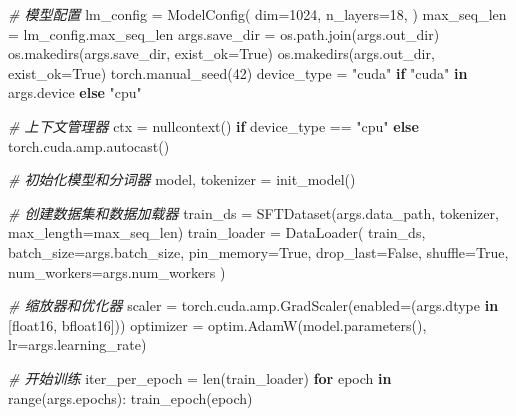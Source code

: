 \documentclass[
]{article}
\newenvironment{Shaded}{}{}
\newcommand{\BuiltInTok}[1]{\textcolor[rgb]{0.00,0.50,0.00}{#1}}
\newcommand{\CommentTok}[1]{\textcolor[rgb]{0.38,0.63,0.69}{\textit{#1}}}
\newcommand{\ControlFlowTok}[1]{\textcolor[rgb]{0.00,0.44,0.13}{\textbf{#1}}}
\newcommand{\DecValTok}[1]{\textcolor[rgb]{0.25,0.63,0.44}{#1}}
\newcommand{\KeywordTok}[1]{\textcolor[rgb]{0.00,0.44,0.13}{\textbf{#1}}}
\newcommand{\NormalTok}[1]{#1}
\newcommand{\OperatorTok}[1]{\textcolor[rgb]{0.40,0.40,0.40}{#1}}
\newcommand{\StringTok}[1]{\textcolor[rgb]{0.25,0.44,0.63}{#1}}
\newcommand{\VariableTok}[1]{\textcolor[rgb]{0.10,0.09,0.49}{#1}}
\begin{document}
\begin{Shaded}
\begin{Highlighting}[]
    \CommentTok{\# 模型配置}
\NormalTok{    lm\_config }\OperatorTok{=}\NormalTok{ ModelConfig(}
\NormalTok{        dim}\OperatorTok{=}\DecValTok{1024}\NormalTok{,}
\NormalTok{        n\_layers}\OperatorTok{=}\DecValTok{18}\NormalTok{,}
\NormalTok{    )}
\NormalTok{    max\_seq\_len }\OperatorTok{=}\NormalTok{ lm\_config.max\_seq\_len}
\NormalTok{    args.save\_dir }\OperatorTok{=}\NormalTok{ os.path.join(args.out\_dir)}
\NormalTok{    os.makedirs(args.save\_dir, exist\_ok}\OperatorTok{=}\VariableTok{True}\NormalTok{)}
\NormalTok{    os.makedirs(args.out\_dir, exist\_ok}\OperatorTok{=}\VariableTok{True}\NormalTok{)}
\NormalTok{    torch.manual\_seed(}\DecValTok{42}\NormalTok{)}
\NormalTok{    device\_type }\OperatorTok{=} \StringTok{"cuda"} \ControlFlowTok{if} \StringTok{"cuda"} \KeywordTok{in}\NormalTok{ args.device }\ControlFlowTok{else} \StringTok{"cpu"}

    \CommentTok{\# 上下文管理器}
\NormalTok{    ctx }\OperatorTok{=}\NormalTok{ nullcontext() }\ControlFlowTok{if}\NormalTok{ device\_type }\OperatorTok{==} \StringTok{"cpu"} \ControlFlowTok{else}\NormalTok{ torch.cuda.amp.autocast()}

    \CommentTok{\# 初始化模型和分词器}
\NormalTok{    model, tokenizer }\OperatorTok{=}\NormalTok{ init\_model()}
    
    \CommentTok{\# 创建数据集和数据加载器}
\NormalTok{    train\_ds }\OperatorTok{=}\NormalTok{ SFTDataset(args.data\_path, tokenizer, max\_length}\OperatorTok{=}\NormalTok{max\_seq\_len)}
\NormalTok{    train\_loader }\OperatorTok{=}\NormalTok{ DataLoader(}
\NormalTok{        train\_ds,}
\NormalTok{        batch\_size}\OperatorTok{=}\NormalTok{args.batch\_size,}
\NormalTok{        pin\_memory}\OperatorTok{=}\VariableTok{True}\NormalTok{,}
\NormalTok{        drop\_last}\OperatorTok{=}\VariableTok{False}\NormalTok{,}
\NormalTok{        shuffle}\OperatorTok{=}\VariableTok{True}\NormalTok{,}
\NormalTok{        num\_workers}\OperatorTok{=}\NormalTok{args.num\_workers}
\NormalTok{    )}

    \CommentTok{\# 缩放器和优化器}
\NormalTok{    scaler }\OperatorTok{=}\NormalTok{ torch.cuda.amp.GradScaler(enabled}\OperatorTok{=}\NormalTok{(args.dtype }\KeywordTok{in}\NormalTok{ [}\StringTok{\textquotesingle{}float16\textquotesingle{}}\NormalTok{, }\StringTok{\textquotesingle{}bfloat16\textquotesingle{}}\NormalTok{]))}
\NormalTok{    optimizer }\OperatorTok{=}\NormalTok{ optim.AdamW(model.parameters(), lr}\OperatorTok{=}\NormalTok{args.learning\_rate)}

    \CommentTok{\# 开始训练}
\NormalTok{    iter\_per\_epoch }\OperatorTok{=} \BuiltInTok{len}\NormalTok{(train\_loader)}
    \ControlFlowTok{for}\NormalTok{ epoch }\KeywordTok{in} \BuiltInTok{range}\NormalTok{(args.epochs):}
\NormalTok{        train\_epoch(epoch)}
\end{Highlighting}
\end{Shaded}
\end{document}

